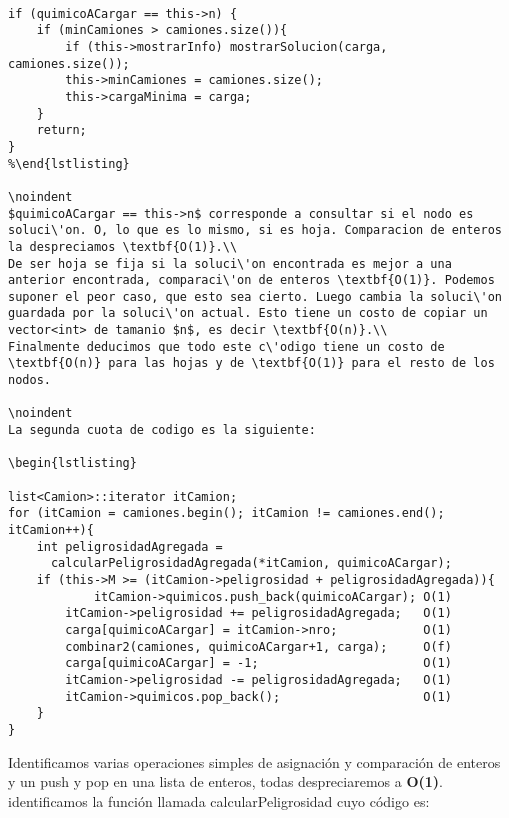\begin{lstlisting}

if (quimicoACargar == this->n) {
	if (minCamiones > camiones.size()){                                 
		if (this->mostrarInfo) mostrarSolucion(carga, camiones.size());
		this->minCamiones = camiones.size();
		this->cargaMinima = carga;
	}
	return;
}
%\end{lstlisting}

\noindent 
$quimicoACargar == this->n$ corresponde a consultar si el nodo es soluci\'on. O, lo que es lo mismo, si es hoja. Comparacion de enteros la despreciamos \textbf{O(1)}.\\
De ser hoja se fija si la soluci\'on encontrada es mejor a una anterior encontrada, comparaci\'on de enteros \textbf{O(1)}. Podemos suponer el peor caso, que esto sea cierto. Luego cambia la soluci\'on guardada por la soluci\'on actual. Esto tiene un costo de copiar un vector<int> de tamanio $n$, es decir \textbf{O(n)}.\\
Finalmente deducimos que todo este c\'odigo tiene un costo de \textbf{O(n)} para las hojas y de \textbf{O(1)} para el resto de los nodos.

\noindent 
La segunda cuota de codigo es la siguiente:

\begin{lstlisting}

list<Camion>::iterator itCamion;
for (itCamion = camiones.begin(); itCamion != camiones.end(); itCamion++){
	int peligrosidadAgregada = 
      calcularPeligrosidadAgregada(*itCamion, quimicoACargar);    
	if (this->M >= (itCamion->peligrosidad + peligrosidadAgregada)){                  
			itCamion->quimicos.push_back(quimicoACargar); O(1)
		itCamion->peligrosidad += peligrosidadAgregada;   O(1)
		carga[quimicoACargar] = itCamion->nro;            O(1)
		combinar2(camiones, quimicoACargar+1, carga);     O(f)
		carga[quimicoACargar] = -1;                       O(1)
		itCamion->peligrosidad -= peligrosidadAgregada;   O(1)
		itCamion->quimicos.pop_back();                    O(1)
	}
}
\end{lstlisting}

\noindent 
Identificamos varias operaciones simples de asignaci\'on y comparaci\'on de enteros y un push y pop en una lista de enteros, todas despreciaremos a \textbf{O(1)}.
identificamos la funci\'on llamada calcularPeligrosidad cuyo c\'odigo es:

